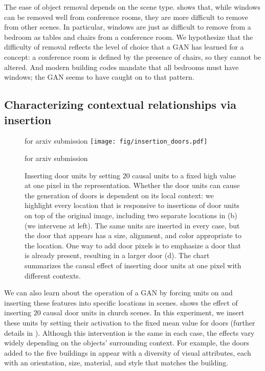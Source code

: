 \documentclass{article} %
\def\arxiv{for arxiv submission}
\begin{document}
The ease of object removal depends on the scene type.   shows that, while windows can be removed well from conference rooms, they are more difficult to remove from other scenes.  In particular, windows are just as difficult to remove from a bedroom as tables and chairs from a conference room.  We hypothesize that the difficulty of removal reflects the level of choice that a GAN has learned for a concept: a conference room is defined by the presence of chairs, so they cannot be altered.  And modern building codes mandate that all bedrooms must have windows; the GAN seems to have caught on to that pattern.

\subsection{Characterizing contextual relationships via insertion}\begin{figure}
\centering
\ifdefined\arxiv
\else
\vspace{-15pt}
\fi
\texttt{[image: fig/insertion\_doors.pdf]}
\vspace{-10pt}
\caption{
Inserting door units by setting $20$ causal units to a fixed high value at one pixel in the representation.  Whether the door units can cause the generation of doors is dependent on its local context: we highlight every location that is responsive to insertions of door units on top of the original image, including two separate locations in (b) (we intervene at left). The same units are inserted in every case, but the door that appears has a size, alignment, and color appropriate to the location.  One way to add door pixels is to emphasize a door that is already present, resulting in a larger door (d).  The chart summarizes the causal effect of inserting door units at one pixel with different contexts.}
\ifdefined\arxiv
\vspace{-15pt}
\else
\vspace{-10pt}
\fi
\end{figure}
We can also learn about the operation of a GAN by forcing units on and inserting these features into specific locations in scenes.    shows the effect of inserting $20$ causal door units in church scenes.  In this experiment, we insert these units by setting their activation to the fixed mean value for doors (further details in ). Although this intervention is the same in each case, the effects vary widely depending on the objects' surrounding context.  For example, the doors added to the five buildings in  appear with a diversity of visual attributes, each with an orientation, size, material, and style that matches the building.
\end{document}
